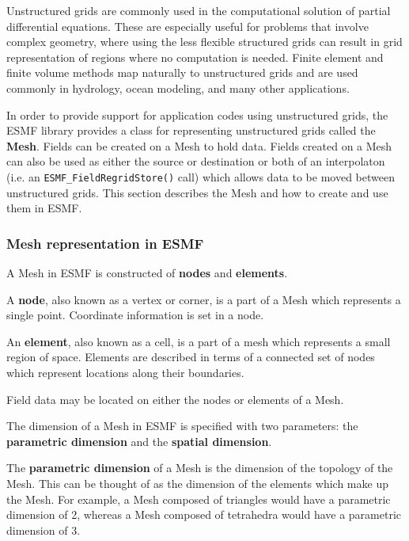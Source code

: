 
Unstructured grids are commonly used in the computational solution of partial differential 
equations.  These are especially useful for problems that involve complex geometry, where 
using the less flexible structured grids can result in grid representation of regions 
where no computation is needed.  Finite element and finite volume methods map naturally 
to unstructured grids and are used commonly in hydrology, ocean modeling, and many other 
applications.

In order to provide support for application codes using unstructured grids, the ESMF library 
provides a class for representing unstructured grids called the {\bf Mesh}. Fields can be 
created on a Mesh to hold data. Fields created on a Mesh can also be used as either the 
source or destination or both of an interpolaton (i.e. an {\tt ESMF\_FieldRegridStore()} call) 
which allows data to be moved between unstructured grids. This section describes the Mesh 
and how to create and use them in ESMF. 

\subsubsection{Mesh representation in ESMF}\label{sec:meshrep}

A Mesh in ESMF is constructed of {\bf nodes} and {\bf elements}.

A {\bf node}, also known as a vertex or corner, is a part of a Mesh which represents a single point. Coordinate information is
set in a node.

An {\bf element}, also known as a cell, is a part of a mesh which represents a small 
region of space. Elements are described in terms of a connected set of nodes which represent locations along their boundaries.

Field data may be located on either the nodes or elements of a Mesh. 

\medskip

The dimension of a Mesh in ESMF is specified with two parameters: the {\bf parametric dimension} and the {\bf spatial dimension}.

The {\bf parametric dimension} of a Mesh is the dimension of the topology of the Mesh. This can be thought of as the dimension of 
the elements which make up the Mesh. For example, a Mesh composed of triangles would have a parametric dimension of 2, whereas
a Mesh composed of tetrahedra would have a parametric dimension of 3. 


